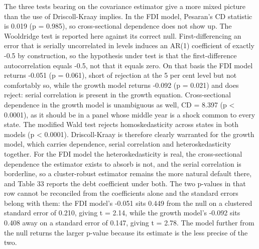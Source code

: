 \documentclass[12pt,a4paper]{article}
\begin{document}
The three tests bearing on the covariance estimator give a more mixed picture than the use of Driscoll-Kraay implies. In the FDI model, Pesaran's CD statistic is 0.019 (p = 0.985), so cross-sectional dependence does not show up. The Wooldridge test is reported here against its correct null. First-differencing an error that is serially uncorrelated in levels induces an AR(1) coefficient of exactly -0.5 by construction, so the hypothesis under test is that the first-difference autocorrelation equals -0.5, not that it equals zero. On that basis the FDI model returns -0.051 (p = 0.061), short of rejection at the 5 per cent level but not comfortably so, while the growth model returns -0.092 (p = 0.021) and does reject: serial correlation is present in the growth equation. Cross-sectional dependence in the growth model is unambiguous as well, CD = 8.397 (p < 0.0001), as it should be in a panel whose middle year is a shock common to every state. The modified Wald test rejects homoskedasticity across states in both models (p < 0.0001). Driscoll-Kraay is therefore clearly warranted for the growth model, which carries dependence, serial correlation and heteroskedasticity together. For the FDI model the heteroskedasticity is real, the cross-sectional dependence the estimator exists to absorb is not, and the serial correlation is borderline, so a cluster-robust estimator remains the more natural default there, and Table 33 reports the debt coefficient under both. The two p-values in that row cannot be reconciled from the coefficients alone and the standard errors belong with them: the FDI model's -0.051 sits 0.449 from the null on a clustered standard error of 0.210, giving t = 2.14, while the growth model's -0.092 sits 0.408 away on a standard error of 0.147, giving t = 2.78. The model further from the null returns the larger p-value because its estimate is the less precise of the two.
\end{document}
